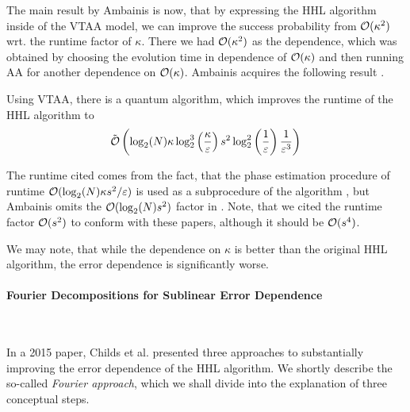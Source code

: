 The main result by Ambainis is now, that by expressing the HHL algorithm inside of the VTAA model, we can improve the success probability from \(\operatorname{\mathcal{O}}(\kappa^2)\) wrt. the runtime factor of \(\kappa\). There we had \(\operatorname{\mathcal{O}}(\kappa^2)\) as the dependence, which was obtained by choosing the evolution time in dependence of \(\operatorname{\mathcal{O}}(\kappa)\) and then running AA for another dependence on \(\operatorname{\mathcal{O}}(\kappa)\). Ambainis acquires the following result \cite[pp. 8-12]{Ambainis2010}.

\begin{theorem}
    Using VTAA, there is a quantum algorithm, which improves the runtime of the HHL algorithm to
    \begin{align}
        \tilde{\operatorname{\mathcal{O}}}\left(\log_2(N) \kappa \log_2^3\left(\frac{\kappa}{\varepsilon}\right) s^2 \log_2^2\left(\frac{1}{\varepsilon}\right) \frac{1}{\varepsilon^3}\right)
    \end{align}
\end{theorem}

The runtime cited comes from the fact, that the phase estimation procedure of runtime \(\operatorname{\mathcal{O}}(\log_2(N) \kappa s^2 / \varepsilon)\) is used as a subprocedure of the algorithm \cite[p. 9]{Ambainis2010}, but Ambainis omits the \(\operatorname{\mathcal{O}}(\log_2(N) s^2)\) factor in \cite[p. 12]{Ambainis2010}. Note, that we cited the runtime factor \(\operatorname{\mathcal{O}}(s^2)\) to conform with these papers, although it should be \(\operatorname{\mathcal{O}}(s^4)\).

\begin{remark}
    We may note, that while the dependence on \(\kappa\) is better than the original HHL algorithm, the error dependence is significantly worse.
\end{remark}

\paragraph*{Fourier Decompositions for Sublinear Error Dependence} \label{hhl_fourier_approach} \phantom{}\\\phantom{}

In a 2015 paper, Childs et al. presented three approaches \cite{Childs2015} to substantially improving the error dependence of the HHL algorithm. We shortly describe the so-called \emph{Fourier approach}, which we shall divide into the explanation of three conceptual steps.

